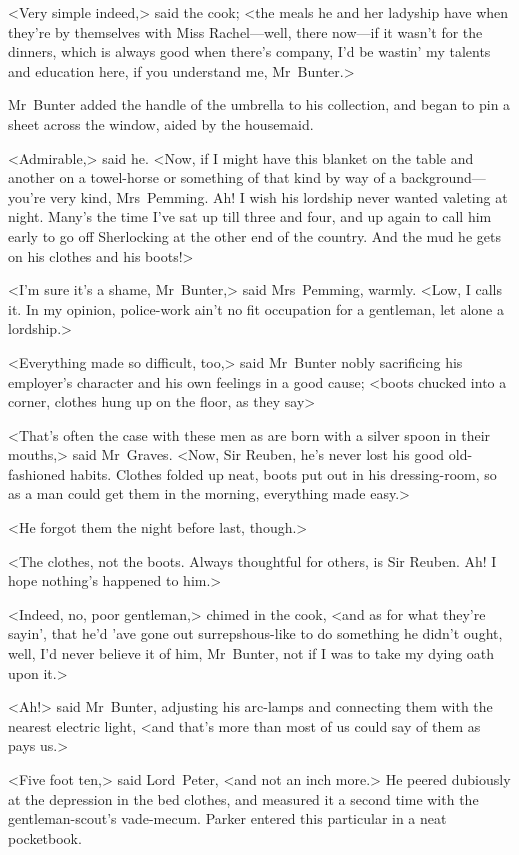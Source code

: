 <Very simple indeed,> said the cook; <the meals he and her ladyship have when they're by themselves with Miss Rachel—well, there now—if it wasn't for the dinners, which is always good when there's company, I'd be wastin' my talents and education here, if you understand me, Mr~Bunter.>

Mr~Bunter added the handle of the umbrella to his collection, and began to pin a sheet across the window, aided by the housemaid.

<Admirable,> said he. <Now, if I might have this blanket on the table and another on a towel-horse or something of that kind by way of a background—you're very kind, Mrs~Pemming\textellipsis . Ah! I wish his lordship never wanted valeting at night. Many's the time I've sat up till three and four, and up again to call him early to go off Sherlocking at the other end of the country. And the mud he gets on his clothes and his boots!>

<I'm sure it's a shame, Mr~Bunter,> said Mrs~Pemming, warmly. <Low, I calls it. In my opinion, police-work ain't no fit occupation for a gentleman, let alone a lordship.>

<Everything made so difficult, too,> said Mr~Bunter nobly sacrificing his employer's character and his own feelings in a good cause; <boots chucked into a corner, clothes hung up on the floor, as they say\longdash>

<That's often the case with these men as are born with a silver spoon in their mouths,> said Mr~Graves. <Now, Sir Reuben, he's never lost his good old-fashioned habits. Clothes folded up neat, boots put out in his dressing-room, so as a man could get them in the morning, everything made easy.>

<He forgot them the night before last, though.>

<The clothes, not the boots. Always thoughtful for others, is Sir Reuben. Ah! I hope nothing's happened to him.>

<Indeed, no, poor gentleman,> chimed in the cook, <and as for what they're sayin', that he'd 'ave gone out surrepshous-like to do something he didn't ought, well, I'd never believe it of him, Mr~Bunter, not if I was to take my dying oath upon it.>

<Ah!> said Mr~Bunter, adjusting his arc-lamps and connecting them with the nearest electric light, <and that's more than most of us could say of them as pays us.>

<Five foot ten,> said Lord~Peter, <and not an inch more.> He peered dubiously at the depression in the bed clothes, and measured it a second time with the gentleman-scout's vade-mecum. Parker entered this particular in a neat pocketbook.

